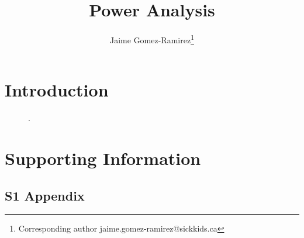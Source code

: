 \documentclass[11pt, onecolumn]{article}
\begin{document}
\title{Power Analysis}

\author[1]{Jaime Gomez-Ramirez\thanks{Corresponding author \hspace{0.6cm} jaime.gomez-ramirez@sickkids.ca}}
\author[2]{}%
\affil[2]{}

\date{}
\maketitle

\begin{abstract}

\end{abstract}
\section{Introduction}
\label{se:intro}

\begin{figure}[H]
    \hfill

    \caption{.}
    \label{fig:sims1}
\end{figure}

%





\newpage
\section*{Supporting Information}
\label{se:suppinf}

\subsection*{S1 Appendix}
\end{document}
